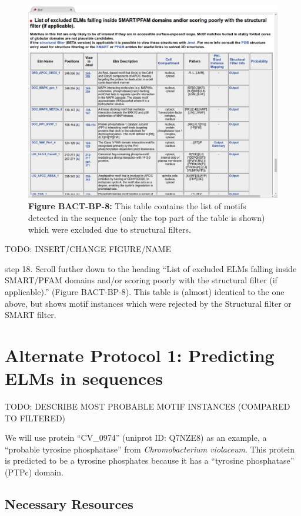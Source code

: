 \begin{figure}[h!]
\centering
\includegraphics[width=\textwidth]{Figures/TP53_1/elm_results_motifs_filtered.png}
\caption{
\textbf{Figure BACT-BP-8:} This table contains the list of motifs
detected in the sequence (only the top part of the table is shown) which
were excluded due to structural filters.
}
\end{figure}

TODO: INSERT/CHANGE FIGURE/NAME

step 18. Scroll further down to the heading ``List of excluded ELMs
falling inside SMART/PFAM domains and/or scoring poorly with the
structural filter (if applicable).'' (Figure BACT-BP-8). This table is
(almost) identical to the one above, but shows motif instances which
were rejected by the Structural filter or SMART filter.

\section{Alternate Protocol 1: Predicting ELMs in
sequences}\label{alternate-protocol-1-predicting-elms-in-sequences}

TODO: DESCRIBE MOST PROBABLE MOTIF INSTANCES (COMPARED TO FILTERED)

We will use protein ``CV\_0974'' (uniprot ID: Q7NZE8) as an example, a
``probable tyrosine phosphatase'' from \emph{Chromobacterium violaceum}.
This protein is predicted to be a tyrosine phosphates because it has a
``tyrosine phosphatase'' (PTPc) domain.

\subsection{Necessary Resources}\label{necessary-resources-1}

